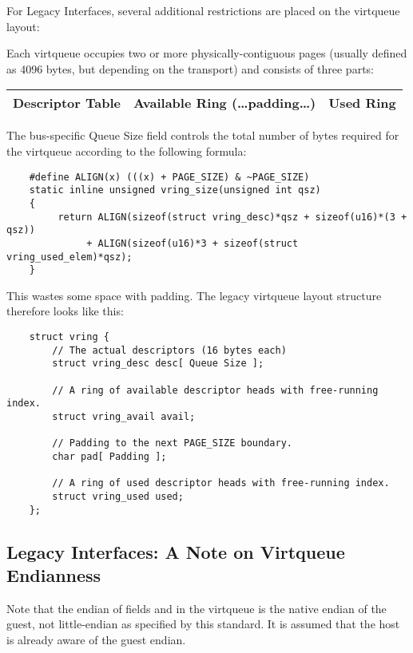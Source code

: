 For Legacy Interfaces, several additional
restrictions are placed on the virtqueue layout:

Each virtqueue occupies two or more physically-contiguous pages
(usually defined as 4096 bytes, but depending on the transport)
and consists of three parts:

\begin{tabular}{|l|l|l|}
\hline
Descriptor Table & Available Ring (\ldots padding\ldots) & Used Ring \\
\hline
\end{tabular}

The bus-specific Queue Size field controls the total number of bytes
required for the virtqueue according to the following formula:

\begin{lstlisting}
	#define ALIGN(x) (((x) + PAGE_SIZE) & ~PAGE_SIZE)
	static inline unsigned vring_size(unsigned int qsz)
	{
	     return ALIGN(sizeof(struct vring_desc)*qsz + sizeof(u16)*(3 + qsz))
	          + ALIGN(sizeof(u16)*3 + sizeof(struct vring_used_elem)*qsz);
	}
\end{lstlisting}

This wastes some space with padding.
The legacy virtqueue layout structure therefore looks like this:

\begin{lstlisting}
	struct vring {
		// The actual descriptors (16 bytes each)
		struct vring_desc desc[ Queue Size ];

		// A ring of available descriptor heads with free-running index.
		struct vring_avail avail;

		// Padding to the next PAGE_SIZE boundary.
		char pad[ Padding ];

		// A ring of used descriptor heads with free-running index.
		struct vring_used used;
	};
\end{lstlisting}

\subsection{Legacy Interfaces: A Note on Virtqueue Endianness}\label{sec:Basic Facilities of a Virtio Device / Virtqueues / Legacy Interfaces: A Note on Virtqueue Endianness}

Note that the endian of fields and in the virtqueue is the native
endian of the guest, not little-endian as specified by this standard.
It is assumed that the host is already aware of the guest endian.

